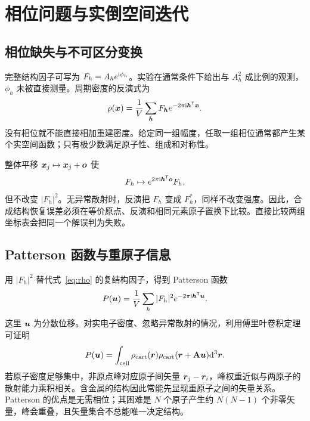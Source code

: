\chapter{相位问题与实倒空间迭代}
\section{相位缺失与不可区分变换}
完整结构因子可写为 $F_h=A_he^{\mathrm{i}\phi_h}$。实验在通常条件下给出与 $A_h^2$ 成比例的观测，$\phi_h$ 未被直接测量。周期密度的反演式为
\begin{equation}
\rho(\bm{x})=\frac1V\sum_{\bm{h}}F_{\bm{h}}e^{-2\pi\mathrm{i}\bm{h}^{\mathsf T}\bm{x}}.
\label{eq:rho}
\end{equation}
没有相位就不能直接相加重建密度。给定同一组幅度，任取一组相位通常都产生某个实空间函数；只有极少数满足原子性、组成和对称性。

整体平移 $\bm{x}_j\mapsto\bm{x}_j+\bm{o}$ 使
\begin{equation}
F_h\mapsto e^{2\pi\mathrm{i}\bm{h}^{\mathsf T}\bm{o}}F_h,
\end{equation}
但不改变 $|F_h|^2$。无异常散射时，反演把 $F_h$ 变成 $F_h^*$，同样不改变强度。因此，合成结构恢复误差必须在等价原点、反演和相同元素原子置换下比较。直接比较两组坐标表会把同一个解误判为失败。

\section{Patterson 函数与重原子信息}
用 $|F_h|^2$ 替代式~\eqref{eq:rho} 的复结构因子，得到 Patterson 函数
\begin{equation}
P(\bm{u})=\frac1V\sum_h|F_h|^2e^{-2\pi\mathrm{i}\bm{h}^{\mathsf T}\bm{u}}.
\end{equation}
这里 $\bm{u}$ 为分数位移。对实电子密度、忽略异常散射的情况，利用傅里叶卷积定理可证明
\begin{equation}
P(\bm{u})=\int_{\mathrm{cell}}\rho_{\mathrm{cart}}(\bm{r})
\rho_{\mathrm{cart}}(\bm{r}+\mathbf{A}\bm{u})\mathrm{d}^3\bm{r}.
\end{equation}
若原子密度足够集中，非原点峰对应原子间矢量 $\bm{r}_j-\bm{r}_i$，峰权重近似与两原子的散射能力乘积相关。含金属的结构因此常能先显现重原子之间的矢量关系。Patterson 的优点是无需相位；其困难是 $N$ 个原子产生约 $N(N-1)$ 个非零矢量，峰会重叠，且矢量集合不总能唯一决定结构。

